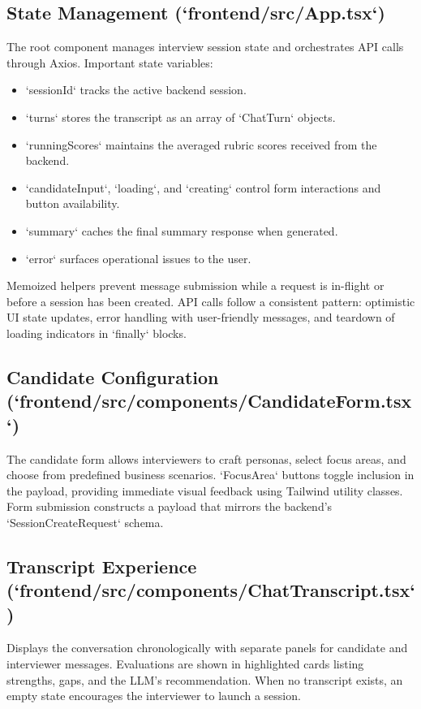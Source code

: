 \documentclass[11pt]{article}
\begin{document}
\subsection{State Management (`frontend/src/App.tsx`)}
The root component manages interview session state and orchestrates API calls through Axios. Important state variables:
\begin{itemize}[leftmargin=*]
  \item `sessionId` tracks the active backend session.
  \item `turns` stores the transcript as an array of `ChatTurn` objects.
  \item `runningScores` maintains the averaged rubric scores received from the backend.
  \item `candidateInput`, `loading`, and `creating` control form interactions and button availability.
  \item `summary` caches the final summary response when generated.
  \item `error` surfaces operational issues to the user.
\end{itemize}
Memoized helpers prevent message submission while a request is in-flight or before a session has been created. API calls follow a consistent pattern: optimistic UI state updates, error handling with user-friendly messages, and teardown of loading indicators in `finally` blocks.

\subsection{Candidate Configuration (`frontend/src/components/CandidateForm.tsx`)}
The candidate form allows interviewers to craft personas, select focus areas, and choose from predefined business scenarios. `FocusArea` buttons toggle inclusion in the payload, providing immediate visual feedback using Tailwind utility classes. Form submission constructs a payload that mirrors the backend's `SessionCreateRequest` schema.

\subsection{Transcript Experience (`frontend/src/components/ChatTranscript.tsx`)}
Displays the conversation chronologically with separate panels for candidate and interviewer messages. Evaluations are shown in highlighted cards listing strengths, gaps, and the LLM's recommendation. When no transcript exists, an empty state encourages the interviewer to launch a session.
\end{document}
